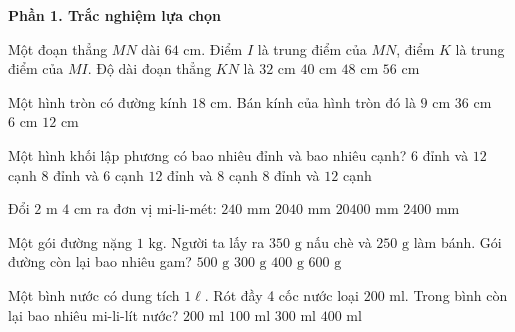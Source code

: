 \textbf{Phần 1. Trắc nghiệm lựa chọn}

\begin{ex} %
Một đoạn thẳng $MN$ dài $64\text{ cm}$. Điểm $I$ là trung điểm của $MN$, điểm $K$ là trung điểm của $MI$. Độ dài đoạn thẳng $KN$ là
\choice
{$32\text{ cm}$}
{$40\text{ cm}$}
{\True $48\text{ cm}$}
{$56\text{ cm}$}
\end{ex}

\begin{ex} %
Một hình tròn có đường kính $18\text{ cm}$. Bán kính của hình tròn đó là
\choice
{\True $9\text{ cm}$}
{$36\text{ cm}$}
{$6\text{ cm}$}
{$12\text{ cm}$}
\end{ex}

\begin{ex} %
Một hình khối lập phương có bao nhiêu đỉnh và bao nhiêu cạnh?
\choice
{$6$ đỉnh và $12$ cạnh}
{$8$ đỉnh và $6$ cạnh}
{$12$ đỉnh và $8$ cạnh}
{\True $8$ đỉnh và $12$ cạnh}
\end{ex}

\begin{ex} %
Đổi $2\text{ m } 4\text{ cm}$ ra đơn vị mi-li-mét:
\choice
{$240\text{ mm}$}
{\True $2040\text{ mm}$}
{$20400\text{ mm}$}
{$2400\text{ mm}$}
\end{ex}

\begin{ex} %
Một gói đường nặng $1\text{ kg}$. Người ta lấy ra $350\text{ g}$ nấu chè và $250\text{ g}$ làm bánh. Gói đường còn lại bao nhiêu gam?
\choice
{$500\text{ g}$}
{$300\text{ g}$}
{\True $400\text{ g}$}
{$600\text{ g}$}
\end{ex}

\begin{ex} %
Một bình nước có dung tích $1\ell$. Rót đầy 4 cốc nước loại $200\text{ ml}$. Trong bình còn lại bao nhiêu mi-li-lít nước?
\choice
{\True $200\text{ ml}$}
{$100\text{ ml}$}
{$300\text{ ml}$}
{$400\text{ ml}$}
\end{ex}

